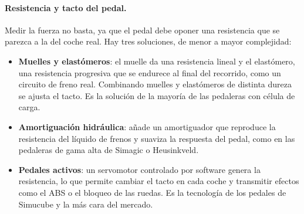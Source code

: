 \paragraph{Resistencia y tacto del pedal.}
Medir la fuerza no basta, ya que el pedal debe oponer una resistencia que se parezca a la del coche real. Hay tres soluciones, de menor a mayor complejidad:
\begin{itemize}
	\item \textbf{Muelles y elastómeros}: el muelle da una resistencia lineal y el elastómero, una resistencia progresiva que se endurece al final del recorrido, como un circuito de freno real.
	Combinando muelles y elastómeros de distinta dureza se ajusta el tacto. Es la solución de la mayoría de las pedaleras con célula de carga.
	\item \textbf{Amortiguación hidráulica}: añade un amortiguador que reproduce la resistencia del líquido de frenos y suaviza la respuesta del pedal, como en las pedaleras de gama alta de Simagic o
	Heusinkveld.
	\item \textbf{Pedales activos}: un servomotor controlado por software genera la resistencia, lo que permite cambiar el tacto en cada coche y transmitir efectos como el ABS o el bloqueo de las ruedas. Es la tecnología de los pedales de Simucube y la más cara del mercado.
\end{itemize}


